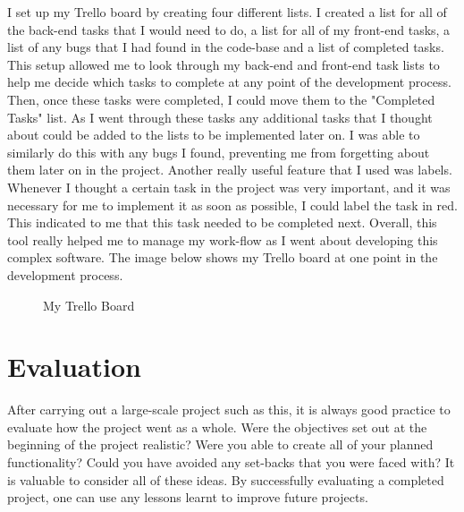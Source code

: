 I set up my Trello board by creating four different lists. I created a list for all of the back-end tasks that I would need to do, a list for all of my front-end tasks, a list of any bugs that I had found in the code-base and a list of completed tasks. This setup allowed me to look through my back-end and front-end task lists to help me decide which tasks to complete at any point of the development process. Then, once these tasks were completed, I could move them to the "Completed Tasks" list. As I went through these tasks any additional tasks that I thought about could be added to the lists to be implemented later on. I was able to similarly do this with any bugs I found, preventing me from forgetting about them later on in the project. Another really useful feature that I used was labels. Whenever I thought a certain task in the project was very important, and it was necessary for me to implement it as soon as possible, I could label the task in red. This indicated to me that this task needed to be completed next. Overall, this tool really helped me to manage my work-flow as I went about developing this complex software. The image below shows my Trello board at one point in the development process.

\begin{figure}[!ht]
	\centering
	\caption{My Trello Board}
\end{figure}

\pagebreak

\section{Evaluation}

After carrying out a large-scale project such as this, it is always good practice to evaluate how the project went as a whole. Were the objectives set out at the beginning of the project realistic? Were you able to create all of your planned functionality? Could you have avoided any set-backs that you were faced with? It is valuable to consider all of these ideas. By successfully evaluating a completed project, one can use any lessons learnt to improve future projects.

